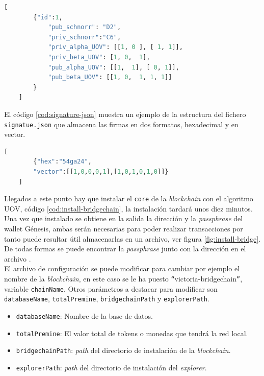 \begin{lstlisting}[language=Python,caption=Ejemplo fichero \texttt{data.json}, label=cod:data-json]
	[
		{"id":1,
			"pub_schnorr": "D2",
			"priv_schnorr":"C6",
			"priv_alpha_UOV": [[1, 0 ], [ 1, 1]],
			"priv_beta_UOV": [1, 0,  1],
			"pub_alpha_UOV": [[1,  1], [ 0, 1]],
			"pub_beta_UOV": [[1, 0,  1, 1, 1]]
		}
	]
\end{lstlisting}

El código \ref{cod:signature-json} muestra un ejemplo de la estructura del fichero \texttt{signatue.json} que almacena las firmas en dos formatos, hexadecimal y en vector.\\

\begin{lstlisting}[language=Python,caption=Ejemplo fichero \texttt{signature.json}, label=cod:signature-json]
	[
		{"hex":"54ga24",
		"vector":[[1,0,0,0,1],[1,0,1,0,1,0]]}
	]
\end{lstlisting}


Llegados a este punto hay que instalar el \texttt{core} de la \textit{blockchain} con el algoritmo UOV, código \ref{cod:install-bridgechain}, la instalación tardará unos diez minutos. Una vez que instalado se obtiene en la salida la dirección y la \textit{passphrase} del wallet Génesis, ambas serán necesarias para poder realizar transacciones por tanto puede resultar útil almacenarlas en un archivo, ver figura \ref{fig:install-bridge}. De todas formas se puede encontrar la \textit{passphrase} junto con la dirección en el archivo . \\

El archivo de configuración  se puede modificar para cambiar por ejemplo el nombre de la \textit{blockchain}, en este caso se le ha puesto  \texttt{``{}}victoria-bridgechain\texttt{''}, variable \texttt{chainName}. Otros parámetros a destacar para modificar son \texttt{databaseName}, \texttt{totalPremine}, \texttt{bridgechainPath} y \texttt{explorerPath}.\\

\begin{itemize}
	\item \texttt{databaseName}: Nombre de la base de datos.
	\item \texttt{totalPremine}: El valor total de tokens o monedas que tendrá la red local.
	\item \texttt{bridgechainPath}: \textit{path} del directorio de instalación de la \textit{blockchain}.
	\item \texttt{explorerPath}: \textit{path} del directorio de instalación del \textit{explorer}.
\end{itemize}

